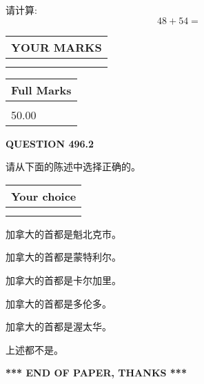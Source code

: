 \documentclass{ctexart}
\begin{document}
  
 
请计算:
\begin{equation}
48 +  %
54 = \nonumber
\end{equation}
 

 

 
  
\vspace{0.2in}
  
\noindent\begin{tabular}{|l|}
\hline
 YOUR MARKS  \\
\hline
 \\ 
 \\ 
\hline
\end{tabular}
\hspace{0.05in} \begin{tabular}{|l|}
\hline
 Full Marks  \\
\hline
 \\ 
50.00 \\
\hline
\end{tabular}
{\textbf{\Large{QUESTION
496.2 
}}}
  
  
请从下面的陈述中选择正确的。
  
  
\noindent\hspace{3.0in} \begin{tabular}{|l|}
\hline
Your choice \\
\hline
 \\ 
 \\ 
\hline
\end{tabular}
  
  
 
 
加拿大的首都是魁北克市。
 
 
加拿大的首都是蒙特利尔。
 
 
加拿大的首都是卡尔加里。
 
 
加拿大的首都是多伦多。
 
 
加拿大的首都是渥太华。
 
 
 上述都不是。
 
 
   
   
 \vspace{0.2in}
 
   
   
   
   
\vspace{1.0in} 
{\textbf{\large{ *** END OF PAPER, THANKS *** }}} 
   
\end{document}
